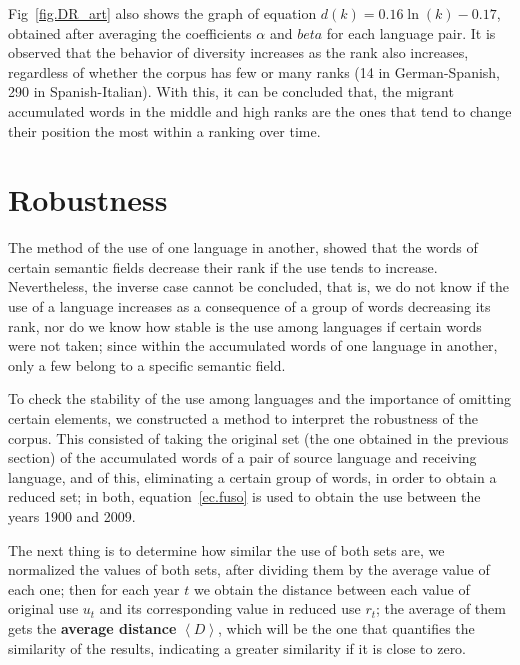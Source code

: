 \documentclass[10pt,letterpaper]{article} %
\begin{document}
	
	Fig~\ref{fig.DR_art} also shows the graph of equation $d(k) = 0.16\ln(k) - 0.17$, obtained after averaging the coefficients $\alpha$ and $beta$ for each language pair. It is observed that the behavior of diversity increases as the rank also increases, regardless of whether the corpus has few or many ranks (14 in German-Spanish, 290 in Spanish-Italian). With this, it can be concluded that, the migrant accumulated words in the middle and high ranks are the ones that tend to change their position the most within a ranking over time.
	
	
	
	\section*{Robustness} %
	
	The method of the use of one language in another, showed that the words of certain semantic fields decrease their rank if the use tends to increase. Nevertheless, the inverse case cannot be concluded, that is, we do not know if the use of a language increases as a consequence of a group of words decreasing its rank, nor do we know how stable is the use among languages if certain words were not taken; since within the accumulated words of one language in another, only a few belong to a specific semantic field.
	
	To check the stability of the use among languages and the importance of omitting certain elements, we constructed a method to interpret the robustness of the corpus. This consisted of taking the original set (the one obtained in the previous section) of the accumulated words of a pair of source language and receiving language, and of this, eliminating a certain group of words, in order to obtain a reduced set; in both,  equation~\ref{ec.fuso} is used to obtain the use between the years 1900 and 2009.
	
	The next thing is to determine how similar the use of both sets are, we normalized the values of both sets, after dividing them by the average value of each one; then for each year $t$ we obtain the distance between each value of original use $u_{t}$ and its corresponding value in reduced use $r_{t}$; the average of them gets the \textbf{average distance} $\left\langle D \right\rangle$, which will be the one that quantifies the similarity of the results, indicating a greater similarity if it is close to zero.
	
\end{document}
